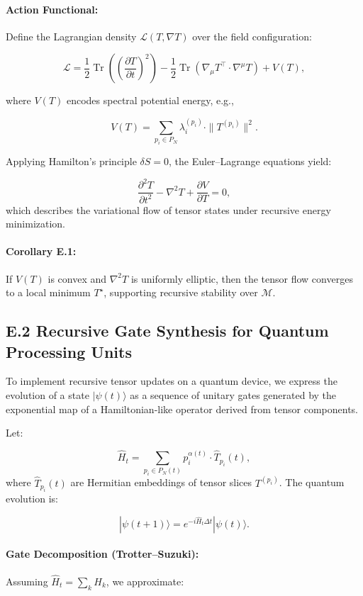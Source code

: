 \paragraph{Action Functional:}
Define the Lagrangian density \(\mathcal{L}(T, \nabla T)\) over the field configuration:

\[
\mathcal{L} = \frac{1}{2} \operatorname{Tr} \left( \left( \frac{\partial T}{\partial t} \right)^2 \right) - \frac{1}{2} \operatorname{Tr} \left( \nabla_\mu T^\top \cdot \nabla^\mu T \right) + V(T),
\]

where \(V(T)\) encodes spectral potential energy, e.g.,

\[
V(T) = \sum_{p_i \in P_N} \lambda_i^{(p_i)} \cdot \|T^{(p_i)}\|^2.
\]

Applying Hamilton’s principle \(\delta S = 0\), the Euler–Lagrange equations yield:

\[
\frac{\partial^2 T}{\partial t^2} - \nabla^2 T + \frac{\partial V}{\partial T} = 0,
\]
which describes the variational flow of tensor states under recursive energy minimization.

\paragraph{Corollary E.1:}
If \(V(T)\) is convex and \(\nabla^2 T\) is uniformly elliptic, then the tensor flow converges to a local minimum \(T^\star\), supporting recursive stability over \(\mathcal{M}\).

\subsection*{E.2 Recursive Gate Synthesis for Quantum Processing Units}

To implement recursive tensor updates on a quantum device, we express the evolution of a state \(|\psi(t)\rangle\) as a sequence of unitary gates generated by the exponential map of a Hamiltonian-like operator derived from tensor components.

Let:

\[
\hat{H}_t = \sum_{p_i \in P_N(t)} p_i^{\alpha(t)} \cdot \hat{T}_{p_i}(t),
\]
where \(\hat{T}_{p_i}(t)\) are Hermitian embeddings of tensor slices \(T^{(p_i)}\). The quantum evolution is:

\[
|\psi(t+1)\rangle = e^{-i \hat{H}_t \Delta t} |\psi(t)\rangle.
\]

\paragraph{Gate Decomposition (Trotter–Suzuki):}
Assuming \(\hat{H}_t = \sum_k H_k\), we approximate:

